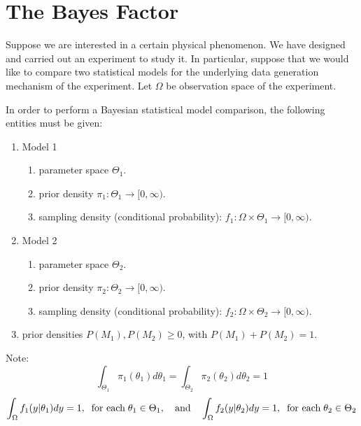 \section{The Bayes Factor}
\setcounter{theorem}{0}

Suppose we are interested in a certain physical phenomenon.  We have designed and carried out an experiment to study it.  In particular, suppose that we would like to compare two statistical models for the underlying data generation mechanism of the experiment.  Let $\Omega$ be observation space of the experiment.

\vskip 0.5cm

\noindent
In order to perform a Bayesian statistical model comparison, the following entities must be given:
\begin{enumerate}
\item  Model 1
	\begin{enumerate}
	\item	parameter space $\Theta_{1}$.
	\item	prior density $\pi_{1} : \Theta_{1} \longrightarrow [0,\infty)$.
	\item	sampling density (conditional probability): $f_{1} : \Omega \times \Theta_{1} \longrightarrow [0,\infty)$.
	\end{enumerate}
\item  Model 2
	\begin{enumerate}
	\item	parameter space $\Theta_{2}$.
	\item	prior density $\pi_{2} : \Theta_{2} \longrightarrow [0,\infty)$.
	\item	sampling density (conditional probability): $f_{2} : \Omega \times \Theta_{2} \longrightarrow [0,\infty)$.
	\end{enumerate}
\item  prior densities $P(M_{1}), P(M_{2}) \geq 0$, with $P(M_{1}) + P(M_{2}) = 1$.
\end{enumerate}

\begin{remark}\quad
Note:
\begin{equation*}
\int_{\Theta_{1}}\pi_{1}(\theta_{1})d\theta_{1} = \int_{\Theta_{2}}\pi_{2}(\theta_{2})d\theta_{2} = 1
\end{equation*}
\begin{equation*}
\int_{\Omega}f_{1}(y|\theta_{1})dy = 1, \;\;\textnormal{for each}\;\theta_{1} \in \Theta_{1},
\quad\textnormal{and}\quad
\int_{\Omega}f_{2}(y|\theta_{2})dy = 1, \;\;\textnormal{for each}\;\theta_{2} \in \Theta_{2}
\end{equation*}
\end{remark}

